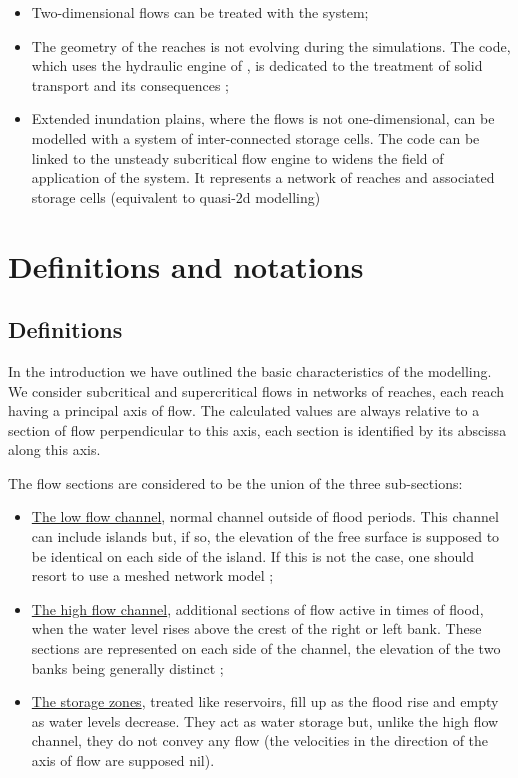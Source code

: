 \begin{itemize}
 \item Two-dimensional flows can be treated with the  system\cite{hervouet07};
 \item The geometry of the reaches is not evolving during the simulations. The \courlis{} code, which uses the hydraulic engine of \mascaret{}, is dedicated to the treatment of solid transport and its consequences ;
 \item Extended inundation plains, where the flows is not one-dimensional, can be modelled with a system of inter-connected storage cells. The \casier{} code can be linked to the unsteady subcritical flow engine to widens the field of application of the \mascaret{} system. It represents a network of reaches and associated storage cells (equivalent to quasi-2d modelling)
\end{itemize}

\section{Definitions and notations}

\subsection{Definitions} \label{secDef}

In the introduction we have outlined the basic characteristics of the modelling.  We consider subcritical and supercritical flows in networks of reaches, each reach having a principal axis of flow. The calculated values are always relative to a section of flow perpendicular to this axis, each section is identified by its abscissa along this axis.

The flow sections are considered to be the union of the three sub-sections:

\begin{itemize}
 \item \underline{The low flow channel}, normal channel outside of flood periods. This channel can include islands but, if so, the elevation of the free surface is supposed to be identical on each side of the island. If this is not the case, one should resort to use a meshed network model ;
 \item \underline{The high flow channel}, additional sections of flow active in times of flood, when the water level rises above the crest of the right or left bank. These sections are represented on each side of the channel, the elevation of the two banks being generally distinct ;
 \item \underline{The storage zones}, treated like reservoirs, fill up as the flood rise and empty as water levels decrease. They act as water storage but, unlike the high flow channel, they do not convey any flow (the velocities in the direction of the axis of flow are supposed nil).
\end{itemize}

